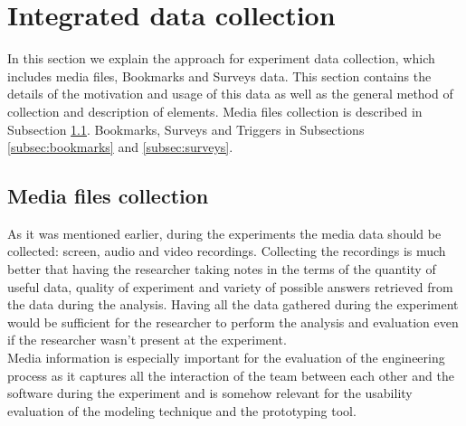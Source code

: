 

\section{Integrated data collection}\label{section:integrated_data_collection}
In this section we explain the approach for experiment data collection, which includes media files, Bookmarks and Surveys data. This section contains the details of the motivation and usage of this data as well as the general method of collection and description of elements. Media files collection is described in Subsection \ref{subsec:media_files}. Bookmarks, Surveys and Triggers in Subsections \ref{subsec:bookmarks} and \ref{subsec:surveys}.\\

\subsection{Media files collection} \label{subsec:media_files}
As it was mentioned earlier, during the experiments the media data should be collected: screen, audio and video recordings. Collecting the recordings is much better that having the researcher taking notes in the terms of the quantity of useful data, quality of experiment and variety of possible answers retrieved from the data during the analysis. Having all the data gathered during the experiment would be sufficient for the researcher to perform the analysis and evaluation even if the researcher wasn't present at the experiment.\\

Media information is especially important for the evaluation of the engineering process as it captures all the interaction of the team between each other and the software during the experiment and is somehow relevant for the usability evaluation of the modeling technique and the prototyping tool.\\

